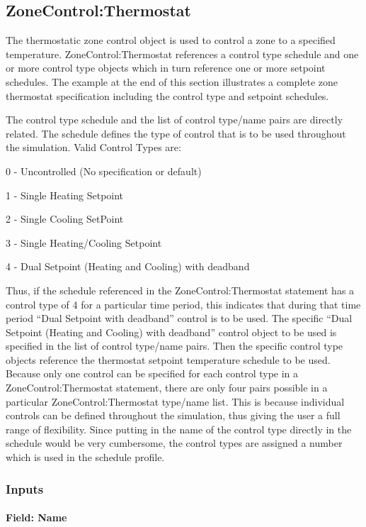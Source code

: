 \subsection{ZoneControl:Thermostat}\label{zonecontrolthermostat}

The thermostatic zone control object is used to control a zone to a specified temperature. ZoneControl:Thermostat references a control type schedule and one or more control type objects which in turn reference one or more setpoint schedules. The example at the end of this section illustrates a complete zone thermostat specification including the control type and setpoint schedules.

The control type schedule and the list of control type/name pairs are directly related. The schedule defines the type of control that is to be used throughout the simulation. Valid Control Types are:

0 - Uncontrolled (No specification or default)

1 - Single Heating Setpoint

2 - Single Cooling SetPoint

3 - Single Heating/Cooling Setpoint

4 - Dual Setpoint (Heating and Cooling) with deadband

Thus, if the schedule referenced in the ZoneControl:Thermostat statement has a control type of 4 for a particular time period, this indicates that during that time period ``Dual Setpoint with deadband'' control is to be used. The specific ``Dual Setpoint (Heating and Cooling) with deadband'' control object to be used is specified in the list of control type/name pairs. Then the specific control type objects reference the thermostat setpoint temperature schedule to be used. Because only one control can be specified for each control type in a ZoneControl:Thermostat statement, there are only four pairs possible in a particular ZoneControl:Thermostat type/name list. This is because individual controls can be defined throughout the simulation, thus giving the user a full range of flexibility. Since putting in the name of the control type directly in the schedule would be very cumbersome, the control types are assigned a number which is used in the schedule profile.

\subsubsection{Inputs}\label{inputs-054}

\paragraph{Field: Name}\label{field-name-052}

